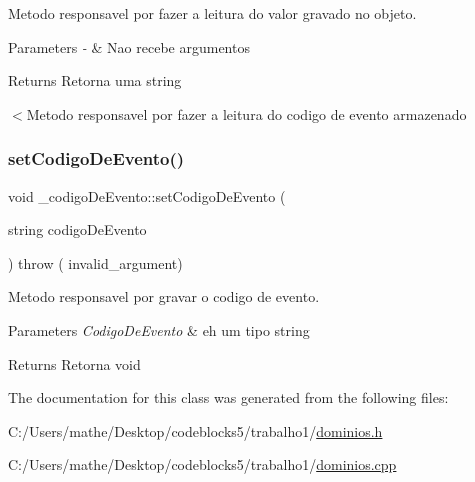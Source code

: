 Metodo responsavel por fazer a leitura do valor gravado no objeto. 


\begin{DoxyParams}{Parameters}
{\em -\/} & Nao recebe argumentos \\
\hline
\end{DoxyParams}
\begin{DoxyReturn}{Returns}
Retorna uma string 
\end{DoxyReturn}
$<$Metodo responsavel por fazer a leitura do codigo de evento armazenado \mbox{\label{class__codigo_de_evento_a48417f2b849fbefa042af1235f6314ab}} 
\subsubsection{\texorpdfstring{setCodigoDeEvento()}{setCodigoDeEvento()}}
{\footnotesize\ttfamily void \+\_\+codigo\+De\+Evento\+::set\+Codigo\+De\+Evento (\begin{DoxyParamCaption}\item[{string}]{codigo\+De\+Evento }\end{DoxyParamCaption}) throw ( invalid\+\_\+argument) }



Metodo responsavel por gravar o codigo de evento. 


\begin{DoxyParams}{Parameters}
{\em Codigo\+De\+Evento} & eh um tipo string \\
\hline
\end{DoxyParams}
\begin{DoxyReturn}{Returns}
Retorna void 
\end{DoxyReturn}


The documentation for this class was generated from the following files\+:\begin{DoxyCompactItemize}
\item 
C\+:/\+Users/mathe/\+Desktop/codeblocks5/trabalho1/\mbox{\hyperlink{dominios_8h}{dominios.\+h}}\item 
C\+:/\+Users/mathe/\+Desktop/codeblocks5/trabalho1/\mbox{\hyperlink{dominios_8cpp}{dominios.\+cpp}}\end{DoxyCompactItemize}

